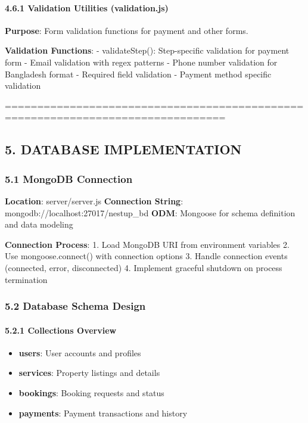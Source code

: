 \documentclass[12pt,a4paper]{article}
\begin{document}
\hypertarget{validation-utilities-validation.js}{%
\paragraph{4.6.1 Validation Utilities
(validation.js)}\label{validation-utilities-validation.js}}

\textbf{Purpose}: Form validation functions for payment and other forms.

\textbf{Validation Functions}: - validateStep(): Step-specific
validation for payment form - Email validation with regex patterns -
Phone number validation for Bangladesh format - Required field
validation - Payment method specific validation

================================================================================

\hypertarget{database-implementation}{%
\subsection{5. DATABASE IMPLEMENTATION}\label{database-implementation}}

\hypertarget{mongodb-connection}{%
\subsubsection{5.1 MongoDB Connection}\label{mongodb-connection}}

\textbf{Location}: server/server.js \textbf{Connection String}:
mongodb://localhost:27017/nestup\_bd \textbf{ODM}: Mongoose for schema
definition and data modeling

\textbf{Connection Process}: 1. Load MongoDB URI from environment
variables 2. Use mongoose.connect() with connection options 3. Handle
connection events (connected, error, disconnected) 4. Implement graceful
shutdown on process termination

\hypertarget{database-schema-design}{%
\subsubsection{5.2 Database Schema
Design}\label{database-schema-design}}

\hypertarget{collections-overview}{%
\paragraph{5.2.1 Collections Overview}\label{collections-overview}}

\begin{itemize}
\tightlist
\item
  \textbf{users}: User accounts and profiles
\item
  \textbf{services}: Property listings and details
\item
  \textbf{bookings}: Booking requests and status
\item
  \textbf{payments}: Payment transactions and history
\end{itemize}
\end{document}

